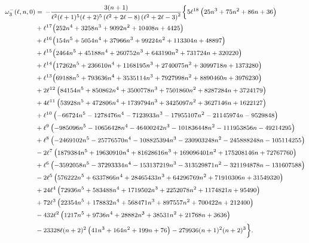 \documentclass[11pt]{article}
\numberwithin{equation}{section}
\begin{document}
\begin{equation}\footnotesize
\begin{aligned}
\omega_3^-(\ell,n,0)&=\,-\frac{3 (n+1)}{\ell^2 (\ell+1)^5 (\ell+2)^5 \left(\ell^2+2 \ell-8\right) \left(\ell^2+2 \ell-3\right)^2}\biggl\{5 \ell^{18} \left(25 n^3+75 n^2+86 n+36\right)\\
&+\ell^{17} \bigl(252 n^4+3258 n^3+9092 n^2+10408 n+4425\bigr)\\
&+\ell^{16} \bigl(154 n^5+5054 n^4+37966 n^3+99224 n^2+113304 n+48897\bigr)\\
&+\ell^{15} \bigl(2464 n^5+45188 n^4+260752 n^3+643190 n^2+731724 n+320220\bigr)\\
&+\ell^{14} \bigl(17262 n^5+236610 n^4+1168195 n^3+2740075 n^2+3099718 n+1373280\bigr)\\
&+\ell^{13} \bigl(69188 n^5+793636 n^4+3535114 n^3+7927998 n^2+8890460 n+3976230\bigr)\\
&+2 \ell^{12} \left(84154 n^5+850862 n^4+3500778 n^3+7501860 n^2+8287284 n+3724179\right)\\
&+4 \ell^{11} \left(53928 n^5+472806 n^4+1739794 n^3+3425097 n^2+3627146 n+1622127\right)\\
&+\ell^{10} \left(-66724 n^5-1278476 n^4-7123933 n^3-17955107 n^2-21145974 n-9529848\right)\\
&+\ell^9 \left(-985096 n^5-10656428 n^4-46400242 n^3-101836448 n^2-111953856 n-49214295\right)\\
&+\ell^8 \left(-2469102 n^5-25776570 n^4-108825394 n^3-230903248 n^2-245888248 n-105114255\right)\\
&-2 \ell^7 \left(1879384 n^5+19630910 n^4+81628616 n^3+169096401 n^2+175208146 n+72767760\right)\\
&+\ell^6 \left(-3592058 n^5-37293334 n^4-153137219 n^3-313529871 n^2-321194878 n-131607588\right)\\
&-2 \ell^5 \left(576222 n^5+6337866 n^4+28465433 n^3+64296769 n^2+71910306 n+31549320\right)\\
&+24 \ell^4 \left(72936 n^5+583488 n^4+1719502 n^3+2252078 n^2+1174821 n+95490\right)\\
&+72 \ell^3 \left(22354 n^5+178832 n^4+568471 n^3+897557 n^2+700422 n+212400\right)\\
&-432 \ell^2 \left(1217 n^5+9736 n^4+28882 n^3+38531 n^2+21768 n+3636\right)\\
&-23328 \ell (n+2)^2 \left(41 n^3+164 n^2+199 n+76\right)-279936 (n+1)^2 (n+2)^3\biggr\}.
\end{aligned}
\end{equation}
\end{document}
